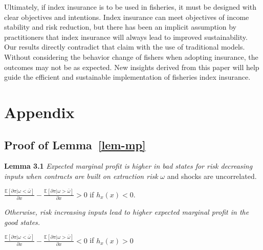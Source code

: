 \documentclass[
  letterpaper,
  DIV=11,
  numbers=noendperiod]{scrartcl}
\theoremstyle{plain}
\theoremstyle{plain}
\theoremstyle{remark}
\begin{document}
Ultimately, if index insurance is to be used in fisheries, it must be
designed with clear objectives and intentions. Index insurance can meet
objectives of income stability and risk reduction, but there has been an
implicit assumption by practitioners that index insurance will always
lead to improved sustainability. Our results directly contradict that
claim with the use of traditional models. Without considering the
behavior change of fishers when adopting insurance, the outcomes may not
be as expected. New insights derived from this paper will help guide the
efficient and sustainable implementation of fisheries index insurance.

\newpage
\appendix
\renewcommand{\thefigure}{A\arabic{figure}}
\renewcommand{\thetable}{A\arabic{table}}
\setcounter{figure}{0}
\setcounter{table}{0}

\section{Appendix}\label{appendix}

\subsection{\texorpdfstring{Proof of
Lemma~\ref{lem-mp}}{Proof of Lemma~}}\label{proof-of-lem-mp}

\textbf{Lemma 3.1} \emph{Expected marginal profit is higher in bad
states for risk decreasing inputs when contracts are built on extraction
risk} \(\omega\) and shocks are uncorrelated.

\(\frac{\mathbb{E}[\partial \pi|\omega<\bar \omega]}{\partial x}-\frac{\mathbb{E}[\partial \pi|\omega>\bar \omega]}{\partial x}>0\)
if \(h_{x}(x)<0\).

\emph{Otherwise, risk increasing inputs lead to higher expected marginal
profit in the good states.}

\(\frac{\mathbb{E}[\partial \pi|\omega<\bar \omega]}{\partial x}-\frac{\mathbb{E}[\partial \pi|\omega>\bar \omega]}{\partial x}<0\)
if \(h_{x}(x)>0\)
\end{document}
